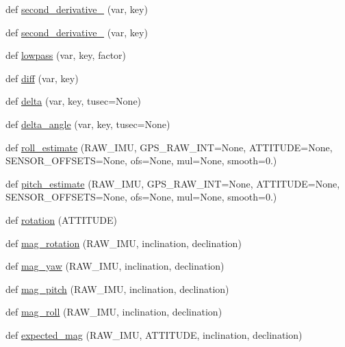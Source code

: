 \begin{DoxyCompactItemize}
\item 
def \hyperlink{namespacepymavlink_1_1mavextra_aaee8500fc795534b56fc2ba040dafb4d}{second\+\_\+derivative\+\_} (var, key)
\item 
def \hyperlink{namespacepymavlink_1_1mavextra_a47da2a88a30ba6ca85072ffa2eabd255}{second\+\_\+derivative\+\_} (var, key)
\item 
def \hyperlink{namespacepymavlink_1_1mavextra_ae160af64a51d6e6c620fc12450857585}{lowpass} (var, key, factor)
\item 
def \hyperlink{namespacepymavlink_1_1mavextra_ab3215121238bdf76cb714ad349d6a17b}{diff} (var, key)
\item 
def \hyperlink{namespacepymavlink_1_1mavextra_a551bb6b34664f22c30ff4eb6342bfd64}{delta} (var, key, tusec=None)
\item 
def \hyperlink{namespacepymavlink_1_1mavextra_a96f32826ccd7a2296e5bb5664d77a9ce}{delta\+\_\+angle} (var, key, tusec=None)
\item 
def \hyperlink{namespacepymavlink_1_1mavextra_a1a001cccb29771aea954d733377c92f9}{roll\+\_\+estimate} (R\+A\+W\+\_\+\+I\+MU, G\+P\+S\+\_\+\+R\+A\+W\+\_\+\+I\+NT=None, A\+T\+T\+I\+T\+U\+DE=None, S\+E\+N\+S\+O\+R\+\_\+\+O\+F\+F\+S\+E\+TS=None, ofs=None, mul=None, smooth=0.)
\item 
def \hyperlink{namespacepymavlink_1_1mavextra_a571222d19bb4574669698dcb01912fb7}{pitch\+\_\+estimate} (R\+A\+W\+\_\+\+I\+MU, G\+P\+S\+\_\+\+R\+A\+W\+\_\+\+I\+NT=None, A\+T\+T\+I\+T\+U\+DE=None, S\+E\+N\+S\+O\+R\+\_\+\+O\+F\+F\+S\+E\+TS=None, ofs=None, mul=None, smooth=0.)
\item 
def \hyperlink{namespacepymavlink_1_1mavextra_a28d2ae204e94f85443cb66a3f4231d80}{rotation} (A\+T\+T\+I\+T\+U\+DE)
\item 
def \hyperlink{namespacepymavlink_1_1mavextra_a55bf2db7a98272c74d86e6e721afddb1}{mag\+\_\+rotation} (R\+A\+W\+\_\+\+I\+MU, inclination, declination)
\item 
def \hyperlink{namespacepymavlink_1_1mavextra_aa2959db40d0a944e4b7f46e3128df872}{mag\+\_\+yaw} (R\+A\+W\+\_\+\+I\+MU, inclination, declination)
\item 
def \hyperlink{namespacepymavlink_1_1mavextra_a34628d19d224246f6da064562dc71b85}{mag\+\_\+pitch} (R\+A\+W\+\_\+\+I\+MU, inclination, declination)
\item 
def \hyperlink{namespacepymavlink_1_1mavextra_ae68ad6b7e203ece0fbb43d292c9e4c31}{mag\+\_\+roll} (R\+A\+W\+\_\+\+I\+MU, inclination, declination)
\item 
def \hyperlink{namespacepymavlink_1_1mavextra_ad27113b5ac550f5a63766348b74641eb}{expected\+\_\+mag} (R\+A\+W\+\_\+\+I\+MU, A\+T\+T\+I\+T\+U\+DE, inclination, declination)

\end{DoxyCompactItemize}
